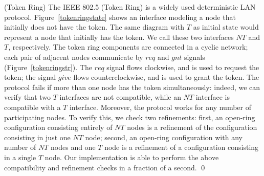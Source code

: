 \begin{examp}{(Token Ring)}
The IEEE 802.5 (Token Ring) is a widely used deterministic 
LAN protocol. Figure~\ref{tokenringstate} shows an interface modeling
a node that initially does not have the token. 
The same diagram with $T$ as initial state would 
represent a node that initially has the token. 
We call these two interfaces $NT$ and $T$, respectively.
The token ring components are connected in a cyclic network; each pair
of adjacent nodes communicate by $req$ and $gnt$ signals
(Figure~\ref{tokenringstr}). 
The $req$ signal flows clockwise, and is used to request the token; 
the signal $give$ flows counterclockwise, and is used to grant the token.
%
%
The protocol fails if more than one node has the token simultaneously:
indeed, we can verify that two $T$ interfaces are not compatible,
while an $NT$ interface is compatible with a $T$ interface.  
Moreover, the protocol works for any number of participating nodes. 
To verify this, we check two refinements: 
first, an open-ring configuration consisting entirely of $NT$ nodes is a
refinement of the configuration consisting in just one $NT$ node; 
second, an open-ring configuration with any number of $NT$ nodes and
one $T$ node is a refinement of a configuration consisting in a single
$T$ node.   
Our implementation is able to perform the above compatibility and
refinement checks in a fraction of a second. \qed 
\end{examp}


